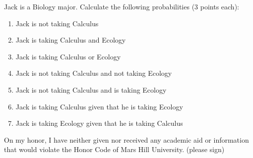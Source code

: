 \documentclass[12pt]{article}
\begin{document}
\begin{enumerate}
Jack is a Biology major.  Calculate the following probabilities (3 points each):
\begin{enumerate}
\item
Jack is not taking Calculus
\vspace{.3 in}
\item
Jack is taking Calculus and Ecology
\vspace{.3 in}
\item
Jack is taking Calculus or Ecology
\vspace{.3in}
\item
Jack is not taking Calculus and not taking Ecology
\vspace{.3 in}
\item
Jack is not taking Calculus and is taking Ecology
\vspace{.3 in}
\item
Jack is taking Calculus given that he is taking Ecology
\vspace{.3 in}
\item
Jack is taking Ecology given that he is taking Calculus
\vspace{.3 in}
\end{enumerate}
\vspace{.5 in}
On my honor, I have neither given nor received any academic aid or information that would violate the Honor Code of Mars Hill University. \underline{\hspace{2.0 in}}(please sign)
\end{enumerate}
\end{document}
